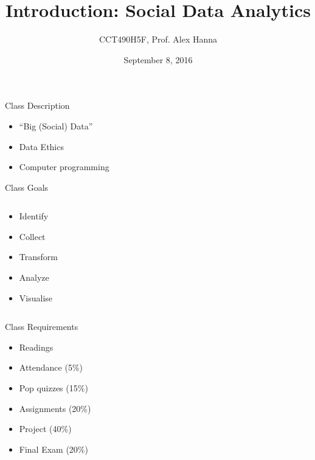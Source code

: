 \documentclass{beamer}
\title[Introduction: Social Data Analytics]
{Introduction: Social Data Analytics}
\author{CCT490H5F, Prof. Alex Hanna}
\institute[] {
}
\date[] {
September 8, 2016
}
\begin{document}
\begin{frame}
  \titlepage
\end{frame}

\begin{frame}{Class Description}
    \begin{itemize}
        \item ``Big (Social) Data''
        \item Data Ethics
        \item Computer programming
    \end{itemize}
\end{frame}

\begin{frame}{Class Goals}
  \begin{columns}
    \begin{column}{0.5\textwidth}
      \begin{itemize}[<+->]
        \item Identify
        \item Collect
        \item Transform
        \item Analyze
        \item Visualise
      \end{itemize}
    \end{column}
    \begin{column}{0.5\textwidth}
    \end{column}
  \end{columns}
\end{frame}

\begin{frame}{Class Requirements}
  \begin{center}
      \begin{itemize}[<+->]
        \item Readings
        \item Attendance (5\%)
        \item Pop quizzes (15\%)
        \item Assignments (20\%)
        \item Project (40\%)
        \item Final Exam (20\%)
      \end{itemize}
  \end{center}
\end{frame}
\end{document}
